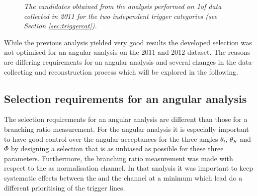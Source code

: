 \begin{figure}[ht]
\begin{center}
\end{center}
\caption{\textit{The \BdKstee candidates obtained from the analysis performed on 1\invfb of \lhcb data collected in 2011 for the two independent trigger categories (see Section \ref{sec:triggercat}).}\cite{paper}}
\label{fig:oldsig}
\end{figure}
While the previous analysis yielded very good results the developed selection was not optimised for 
an angular analysis on the 2011 and 2012 dataset. The reasons are differing requirements for an angular analysis and several changes in the data-collecting and reconstruction process which will be explored in the following.

\subsection{Selection requirements for an angular analysis}
\label{sec:req}
The selection requirements for an angular analysis are different than those for a branching ratio measurement. 
For the angular analysis it is especially important to have good control over the angular acceptances for the three angles $\theta_l$, $\theta_K$ and $\Phi$ by designing a selection that is as unbiased as possible for these three parameters. Furthermore, the branching ratio measurement was made with respect to the \BdToJPsieeKst as normalisation channel. In that analysis it was important to keep systematic effects between the \BdKstee and the \BdToJPsieeKst channel at a minimum which lead do a different prioritising of the trigger lines.  \\



